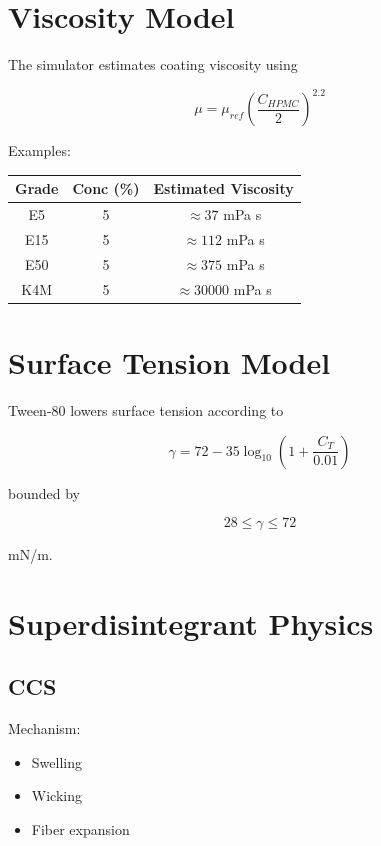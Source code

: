\documentclass[11pt]{article}
\begin{document}
\section{Viscosity Model}

The simulator estimates coating viscosity using

\begin{equation}
\mu =
\mu_{ref}
\left(
\frac{C_{HPMC}}{2}
\right)^{2.2}
\end{equation}

Examples:

\begin{center}
\begin{tabular}{ccc}
\toprule
Grade & Conc (\%) & Estimated Viscosity\\
\midrule
E5 & 5 & $\approx 37$ mPa s\\
E15 & 5 & $\approx 112$ mPa s\\
E50 & 5 & $\approx 375$ mPa s\\
K4M & 5 & $\approx 30000$ mPa s\\
\bottomrule
\end{tabular}
\end{center}

\section{Surface Tension Model}

Tween-80 lowers surface tension according to

\begin{equation}
\gamma =
72-
35\log_{10}
\left(
1+\frac{C_T}{0.01}
\right)
\end{equation}

bounded by

\begin{equation}
28 \le \gamma \le 72
\end{equation}

mN/m.

\section{Superdisintegrant Physics}

\subsection{CCS}

Mechanism:

\begin{itemize}
\item Swelling
\item Wicking
\item Fiber expansion
\end{itemize}
\end{document}
